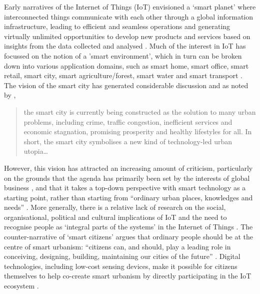 Early narratives of the Internet of Things (IoT) envisioned a ‘smart
planet’ where interconnected things communicate with each other
through a global information infrastructure, leading to efficient and
seamless operations and generating virtually unlimited opportunities
to develop new products and services based on insights from the data
collected and analysed \cite{Kopetz-2011-IOT, Shin-2017-UTIO}.
Much of the interest in IoT has focussed on the notion of a 'smart
environment', which in turn can be broken down into various
application domains, such as smart home, smart office, smart retail,
smart city, smart agriculture/forest, smart water and smart transport \cite{Gubbi-2013-IOT}.
The vision of the smart city has generated considerable discussion and
as noted by \cite{Hollands-2015-CIIT}, 
\begin{quote}
  the smart city is currently being constructed as the solution to
  many urban problems, including crime, traffic congestion, inefficient
  services and economic stagnation, promising prosperity and healthy
  lifestyles for all. In short, the smart city symbolises a new kind
  of technology-led urban utopia\ldots
\end{quote}

However, this vision has attracted an increasing amount of criticism,
particularly on the grounds that the agenda has primarily been set by the
interests of global business \cite{Hollands-2015-CIIT}, and that it
takes a top-down perspective with smart technology as a starting
point, rather than starting from ``ordinary urban places, knowledges
and needs'' \cite{Mcfarlane-2017-OASC}.  More generally, there is a
relative lack of research on the social, organisational, political and
cultural implications of IoT and the need to recognise people as
‘integral parts of the systems’ in the Internet of Things \cite{Shin-2014-ASTF}.  The
counter-narrative of `smart citizens' argues that ordinary people
should be at the centre of smart urbanism: ``citizens can, and should,
play a leading role in conceiving, designing, building, maintaining
our cities of the future'' \cite{Hemment-2013-SC,Hemment-2016-HTDU}.
Digital technologies, including low-cost sensing devices, make it
possible for citizens themselves to help co-create smart urbanism by
directly participating in the IoT ecosystem
\cite{Balestrini-2017-OCTT}.

